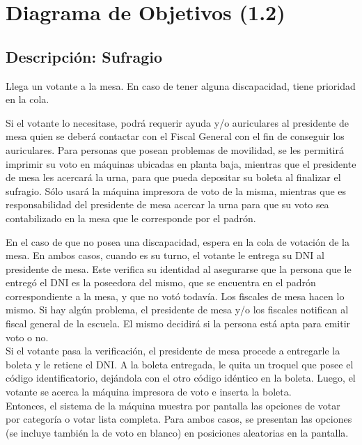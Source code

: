 \section{Diagrama de Objetivos (1.2)}

\subsection{Descripci\'on: Sufragio}


Llega un votante a la mesa. En caso de tener alguna discapacidad, tiene prioridad en la cola. 

Si el votante lo necesitase, podrá requerir ayuda y/o auriculares al presidente de mesa quien se deberá contactar con el Fiscal General con el fin de conseguir los auriculares. Para personas que posean problemas de movilidad, se les permitirá imprimir su voto en máquinas ubicadas en planta baja, mientras que el presidente de mesa les acercará la urna, para que pueda depositar su boleta al finalizar el sufragio. Sólo usará la máquina impresora de voto de la misma, mientras que es responsabilidad del presidente de mesa acercar la urna para que su voto sea contabilizado en la mesa que le corresponde por el padrón.

En el caso de que no posea una discapacidad, espera en la cola de votación de la mesa. 
En ambos casos, cuando es su turno, el votante le entrega su DNI al presidente de mesa. Este verifica su identidad al asegurarse que la persona que le entregó el DNI es la poseedora del mismo, que se encuentra en el padrón correspondiente a la mesa, y que no votó todavía. Los fiscales de mesa hacen lo mismo. Si hay algún problema, el presidente de mesa y/o los fiscales notifican al fiscal general de la escuela. El mismo decidirá si la persona está apta para emitir voto o no.\\

Si el votante pasa la verificación, el presidente de mesa procede a entregarle la boleta y le retiene el DNI. A la boleta entregada, le quita un troquel que posee el código identificatorio, dejándola con el otro código idéntico en la boleta.
Luego, el votante se acerca la máquina impresora de voto e inserta la boleta.\\

Entonces, el sistema de la máquina muestra por pantalla las opciones de votar por categoría o votar lista completa. Para ambos casos, se presentan las opciones (se incluye también la de voto en blanco) en posiciones aleatorias en la pantalla.

